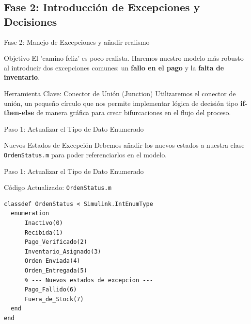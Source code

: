 \documentclass[aspectratio=169,xcolor=dvipsnames]{beamer}
\begin{document}
\subsection{Fase 2: Introducción de Excepciones y Decisiones}

\begin{frame}{Fase 2: Manejo de Excepciones y añadir realismo}
    \begin{block}{Objetivo}
    El 'camino feliz' es poco realista. Haremos nuestro modelo más robusto al introducir dos excepciones comunes: un \textbf{fallo en el pago} y la \textbf{falta de inventario}.
    \end{block}
    
    \begin{alertblock}{Herramienta Clave: Conector de Unión (Junction)}
    Utilizaremos el conector de unión, un pequeño círculo que nos permite implementar lógica de decisión tipo \textbf{if-then-else} de manera gráfica para crear bifurcaciones en el flujo del proceso.
    \end{alertblock}
\end{frame}


\begin{frame}[fragile]{Paso 1: Actualizar el Tipo de Dato Enumerado}
    \begin{block}{Nuevos Estados de Excepción}
    Debemos añadir los nuevos estados a nuestra clase \texttt{OrdenStatus.m} para poder referenciarlos en el modelo.
    \end{block}

    
\end{frame}

\begin{frame}[fragile]{Paso 1: Actualizar el Tipo de Dato Enumerado}

\begin{alertblock}{Código Actualizado: \texttt{OrdenStatus.m}}
    \begin{lstlisting}
classdef OrdenStatus < Simulink.IntEnumType
  enumeration
      Inactivo(0)
      Recibida(1)
      Pago_Verificado(2)
      Inventario_Asignado(3)
      Orden_Enviada(4)
      Orden_Entregada(5)
      % --- Nuevos estados de excepcion ---
      Pago_Fallido(6)
      Fuera_de_Stock(7)
  end
end
    \end{lstlisting}
    \end{alertblock}
\end{frame}
\end{document}
